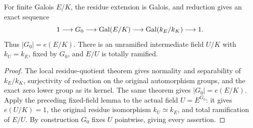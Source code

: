 \begin{lemma}
\label{fw:inertia-quotient}
\leanok
For finite Galois $E/K$, the residue extension is Galois, and reduction
gives an exact sequence
\[
 1\longrightarrow G_0\longrightarrow\operatorname{Gal}(E/K)
   \longrightarrow\operatorname{Gal}(k_E/k_K)\longrightarrow1.
\]
Thus $|G_0|=e(E/K)$. There is an unramified intermediate field $U/K$
with $k_U=k_E$, fixed by $G_0$, and $E/U$ is totally ramified.
\end{lemma}
\begin{proof}
The local residue-quotient theorem gives normality and separability of
$k_E/k_K$, surjectivity of reduction on the original automorphism
groups, and the exact zero lower group as its kernel. The same theorem
gives $|G_0|=e(E/K)$. Apply the preceding fixed-field lemma to the actual
field $U=E^{G_0}$: it gives $e(U/K)=1$, the original residue isomorphism
$k_U\simeq k_E$, and total ramification of $E/U$. By construction $G_0$
fixes $U$ pointwise, giving every assertion.
\end{proof}

